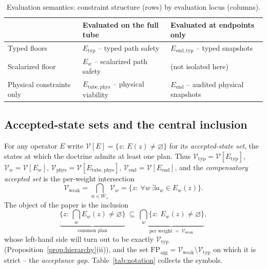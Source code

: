 \documentclass[preprint,11pt,authoryear]{elsarticle}
\theoremstyle{definition}
\theoremstyle{remark}
\newcommand{\Etyp}{E_{\mathrm{typ}}}
\newcommand{\Eend}{E_{\mathrm{end}}}
\newcommand{\Ephys}{E_{\mathrm{tube,phys}}}
\newcommand{\Vtyp}{\mathcal{V}_{\mathrm{typ}}}
\newcommand{\Vweak}{\mathcal{V}_{\mathrm{weak}}}
\newcommand{\Vphys}{\mathcal{V}_{\mathrm{phys}}}
\newcommand{\Vend}{\mathcal{V}_{\mathrm{end}}}
\newcommand{\Wp}{W_+}
\newcommand{\FP}{\mathrm{FP}_{\mathrm{agg}}}
\begin{document}
\begin{table}[!htbp]
\centering\small
\caption{Evaluation semantics: constraint structure (rows) by evaluation locus (columns).}
\label{tab:semantics}
\begin{tabularx}{\textwidth}{@{}>{\raggedright\arraybackslash}p{}XX@{}}
\toprule
 & Evaluated on the full tube & Evaluated at endpoints only \\
\midrule
Typed floors & $\Etyp$ -- typed path safety & $E_{\mathrm{end,typ}}$ -- typed snapshots \\
Scalarized floor & $E_w$ -- scalarized path safety & (not isolated here) \\
Physical constraints only & $\Ephys$ -- physical viability & $\Eend$ -- audited physical snapshots \\
\bottomrule
\end{tabularx}
\end{table}

\subsection{Accepted-state sets and the central inclusion}

For any operator $E$ write $\mathcal V[E]=\{z:\ E(z)\ne\varnothing\}$ for its \emph{accepted-state set}, the states at which the doctrine admits at least one plan. Thus $\Vtyp=\mathcal V[\Etyp]$, $\mathcal V_w=\mathcal V[E_w]$, $\Vphys=\mathcal V[\Ephys]$, $\Vend=\mathcal V[\Eend]$, and the \emph{compensatory accepted set} is the per-weight intersection
\begin{equation}
\Vweak=\bigcap_{w\in\Wp}\mathcal V_w=\{z:\ \forall w\ \exists a_w\in E_w(z)\}.
\label{eq:Vweak}
\end{equation}
The object of the paper is the inclusion
\begin{equation}
\underbrace{\{z:\ \textstyle\bigcap_w E_w(z)\neq\varnothing\}}_{\text{common plan}}\ \subseteq\ \underbrace{\bigcap_w\{z:\ E_w(z)\neq\varnothing\}}_{\text{per weight}\ =\ \Vweak},
\label{eq:central}
\end{equation}
whose left-hand side will turn out to be exactly $\Vtyp$ (Proposition~\ref{prop:hierarchy}(ii)), and the set $\FP=\Vweak\setminus\Vtyp$ on which it is strict -- the \emph{acceptance gap}. Table~\ref{tab:notation} collects the symbols.
\end{document}
